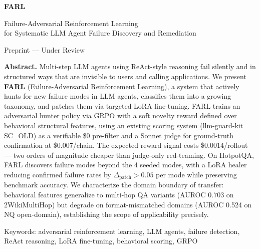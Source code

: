 \documentclass[11pt,a4paper]{article}
\begin{document}
\begin{titlepage}
\thispagestyle{empty}

\vspace*{2cm}

{\color{white}\Huge\bfseries FARL}

\vspace{0.3cm}
{\color{white!90}\Large Failure-Adversarial Reinforcement Learning\\for Systematic LLM Agent Failure Discovery and Remediation}

\vspace{1cm}
\noindent\colorbox{warning!90}{%
  \parbox{0.9\textwidth}{\color{white}\centering\large
    Preprint --- Under Review
  }%
}

\vspace{3cm}

{\large
\textbf{Abstract.}
Multi-step LLM agents using ReAct-style reasoning fail silently and in
structured ways that are invisible to users and calling applications.
We present \textbf{FARL} (Failure-Adversarial Reinforcement Learning),
a system that actively hunts for new failure modes in LLM agents,
classifies them into a growing taxonomy, and patches them via targeted
LoRA fine-tuning. FARL trains an adversarial hunter policy via GRPO
with a soft novelty reward defined over behavioral structural features,
using an existing scoring system (llm-guard-kit SC\_OLD) as a verifiable
\$0 pre-filter and a Sonnet judge for ground-truth confirmation at
\$0.007/chain. The expected reward signal costs \$0.0014/rollout ---
two orders of magnitude cheaper than judge-only red-teaming. On HotpotQA,
FARL discovers failure modes beyond the 4 seeded modes, with a LoRA healer
reducing confirmed failure rates by $\Delta_\text{patch} > 0.05$ per mode
while preserving benchmark accuracy. We characterize the domain boundary
of transfer: behavioral features generalize to multi-hop QA variants
(AUROC 0.703 on 2WikiMultiHop) but degrade on format-mismatched domains
(AUROC 0.524 on NQ open-domain), establishing the scope of applicability
precisely.
}

\vfill

{\small\color{gray}
  Keywords: adversarial reinforcement learning, LLM agents, failure detection,
  ReAct reasoning, LoRA fine-tuning, behavioral scoring, GRPO
}
\end{titlepage}
\end{document}
